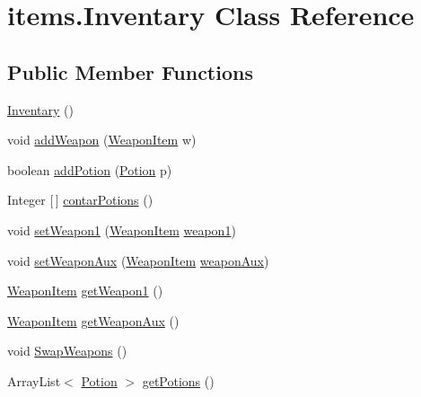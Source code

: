 \hypertarget{classitems_1_1_inventary}{}\section{items.\+Inventary Class Reference}
\label{classitems_1_1_inventary}
\subsection*{Public Member Functions}
\begin{DoxyCompactItemize}
\item 
\mbox{\hyperlink{classitems_1_1_inventary_a375b341c9d44109ab5170722c5a614ee}{Inventary}} ()
\item 
void \mbox{\hyperlink{classitems_1_1_inventary_acbe2d05e6721de48084dbdf279cfccfd}{add\+Weapon}} (\mbox{\hyperlink{classitems_1_1_weapon_item}{Weapon\+Item}} w)
\item 
boolean \mbox{\hyperlink{classitems_1_1_inventary_ab729ee27d843b475311e4738a39782cf}{add\+Potion}} (\mbox{\hyperlink{classitems_1_1_potion}{Potion}} p)
\item 
Integer \mbox{[}$\,$\mbox{]} \mbox{\hyperlink{classitems_1_1_inventary_a296224dd144bd2e6c11d7024d73767c3}{contar\+Potions}} ()
\item 
void \mbox{\hyperlink{classitems_1_1_inventary_a41de26269c15ca5a9ecac80c89f2454c}{set\+Weapon1}} (\mbox{\hyperlink{classitems_1_1_weapon_item}{Weapon\+Item}} \mbox{\hyperlink{classitems_1_1_inventary_ad16ddfb714d749294e1fe64841ca9074}{weapon1}})
\item 
void \mbox{\hyperlink{classitems_1_1_inventary_a920b6b914a6a972f6aeb92f5799755b9}{set\+Weapon\+Aux}} (\mbox{\hyperlink{classitems_1_1_weapon_item}{Weapon\+Item}} \mbox{\hyperlink{classitems_1_1_inventary_a1f8cf512e097112b449136da9c6670b7}{weapon\+Aux}})
\item 
\mbox{\hyperlink{classitems_1_1_weapon_item}{Weapon\+Item}} \mbox{\hyperlink{classitems_1_1_inventary_a250533cf9b23d61ec3489446538e38d1}{get\+Weapon1}} ()
\item 
\mbox{\hyperlink{classitems_1_1_weapon_item}{Weapon\+Item}} \mbox{\hyperlink{classitems_1_1_inventary_aaae786de7d4cb302e79c5f549fd2b608}{get\+Weapon\+Aux}} ()
\item 
void \mbox{\hyperlink{classitems_1_1_inventary_aa690ec2080d618693b97a6a27246098b}{Swap\+Weapons}} ()
\item 
Array\+List$<$ \mbox{\hyperlink{classitems_1_1_potion}{Potion}} $>$ \mbox{\hyperlink{classitems_1_1_inventary_af31e133ffd38797c19c417526304fec7}{get\+Potions}} ()

\end{DoxyCompactItemize}
